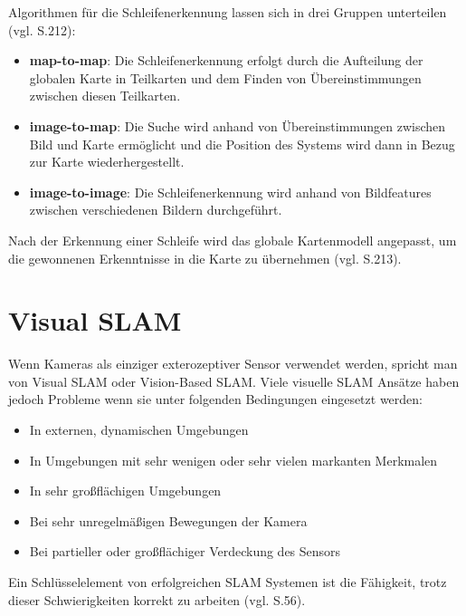 Algorithmen für die Schleifenerkennung lassen sich in drei Gruppen unterteilen (vgl. \cite{loop_closure} S.212):

\begin{itemize}
\item \textbf{map-to-map}: Die Schleifenerkennung erfolgt durch die Aufteilung der globalen Karte in Teilkarten und dem Finden von Übereinstimmungen zwischen diesen Teilkarten.

\item \textbf{image-to-map}: Die Suche wird anhand von Übereinstimmungen zwischen Bild und Karte ermöglicht und die Position des Systems wird dann in Bezug zur Karte wiederhergestellt.

\item \textbf{image-to-image}: Die Schleifenerkennung wird anhand von Bildfeatures zwischen verschiedenen Bildern durchgeführt.

\end{itemize}
Nach der Erkennung einer Schleife wird das globale Kartenmodell angepasst, um die gewonnenen Erkenntnisse in die Karte zu übernehmen (vgl. \cite{loop_closure} S.213).

\section{Visual SLAM}

Wenn Kameras als einziger exterozeptiver Sensor verwendet werden, spricht man von \glqq Visual SLAM\grqq{} oder \glqq Vision-Based SLAM\grqq{}. Viele visuelle SLAM Ansätze haben jedoch Probleme wenn sie unter folgenden Bedingungen eingesetzt werden:

\begin{itemize}
\item In externen, dynamischen Umgebungen
\item In Umgebungen mit sehr wenigen oder sehr vielen markanten Merkmalen
\item In sehr großflächigen Umgebungen
\item Bei sehr unregelmäßigen Bewegungen der Kamera
\item Bei partieller oder großflächiger Verdeckung des Sensors
\end{itemize}

Ein Schlüsselelement von erfolgreichen SLAM Systemen ist die Fähigkeit, trotz dieser Schwierigkeiten korrekt zu arbeiten (vgl. \cite{survey} S.56).

